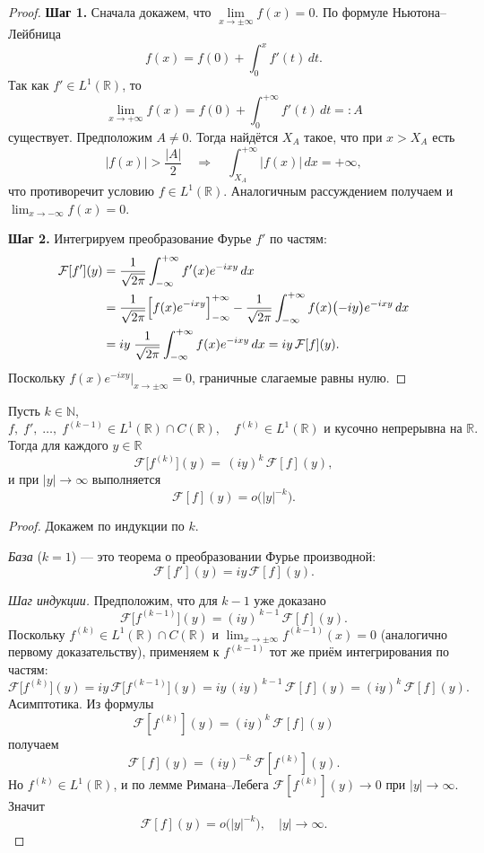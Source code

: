 \begin{proof}
\textbf{Шаг 1.} 
Сначала докажем, что $\lim\limits_{x\to\pm\infty}f(x)=0$. По формуле Ньютона–Лейбница
\[
f(x)=f(0)+\int_{0}^{x}f'(t)\,dt.
\]
Так как $f'\in L^1(\mathbb R)$, то
\[
\lim_{x\to+\infty}f(x)
=f(0)+\int_0^{+\infty}f'(t)\,dt =: A
\]
существует. Предположим $A\neq0$. Тогда найдётся $X_A$ такое, что при $x>X_A$ есть
\[
|f(x)|>\frac{|A|}{2}
\quad\Longrightarrow\quad
\int_{X_A}^{+\infty}|f(x)|\,dx = +\infty,
\]
что противоречит условию $f\in L^1(\mathbb R)$. Аналогичным рассуждением получаем и $\lim_{x\to-\infty}f(x)=0$.

\medskip
\noindent\textbf{Шаг 2.}
Интегрируем преобразование Фурье $f'$ по частям:
\begin{align*}
\mathcal F[f'](y)
&=\frac1{\sqrt{2\pi}}\int_{-\infty}^{+\infty}f'(x)e^{-i x y}\,dx\\
&=\frac1{\sqrt{2\pi}}\Bigl[f(x)e^{-i x y}\Bigr]_{-\infty}^{+\infty}
-\frac1{\sqrt{2\pi}}\int_{-\infty}^{+\infty}f(x)\bigl(-i y\bigr)e^{-i x y}\,dx\\
&= i y\;\frac1{\sqrt{2\pi}}\int_{-\infty}^{+\infty}f(x)e^{-i x y}\,dx
= i y\,\mathcal F[f](y).
\end{align*}
Поскольку $f(x)e^{-i x y}\Big|_{x\to\pm\infty}=0$, граничные слагаемые равны нулю.
\end{proof}
\begin{corollary}
Пусть $k\in\mathbb{N}$, 
\[
f,\;f',\;\dots,\;f^{(k-1)}\in L^1(\mathbb R)\cap C(\mathbb R),
\quad
f^{(k)}\in L^1(\mathbb R)\text{ и кусочно непрерывна на }\mathbb R.
\]
Тогда для каждого $y\in\mathbb R$
\[
\mathcal F\bigl[f^{(k)}\bigr](y)
=\,(i y)^k\,\mathcal F[f](y),
\]
и при $|y|\to\infty$ выполняется
\[
\mathcal F[f](y)=o\bigl(|y|^{-k}\bigr).
\]
\end{corollary}

\begin{proof}
Докажем по индукции по $k$.

\textit{База} ($k=1$) — это теорема о преобразовании Фурье производной:
\[
\mathcal F[f'](y)
=iy\,\mathcal F[f](y).
\]

\textit{Шаг индукции.} Предположим, что для $k-1$ уже доказано
\[
\mathcal F\bigl[f^{(k-1)}\bigr](y)
=(iy)^{\,k-1}\,\mathcal F[f](y).
\]
Поскольку $f^{(k)}\in L^1(\mathbb R)\cap C(\mathbb R)$ и $\lim_{x\to\pm\infty}f^{(k-1)}(x)=0$
(аналогично первому доказательству), применяем к $f^{(k-1)}$ тот же приём интегрирования по частям:
\[
\mathcal F\bigl[f^{(k)}\bigr](y)
=iy\,\mathcal F\bigl[f^{(k-1)}\bigr](y)
=iy\,(iy)^{\,k-1}\,\mathcal F[f](y)
=(iy)^k\,\mathcal F[f](y).
\]
Асимптотика. Из формулы
\[
\mathcal F[f^{(k)}](y)
=(iy)^k\,\mathcal F[f](y)
\]
получаем
\[
\mathcal F[f](y)
=(iy)^{-k}\,\mathcal F[f^{(k)}](y).
\]
Но $f^{(k)}\in L^1(\mathbb R)$, и по лемме Римана–Лебега
$\mathcal F[f^{(k)}](y)\to0$ при $|y|\to\infty$. Значит
\[
\mathcal F[f](y)
=o\bigl(|y|^{-k}\bigr),
\quad |y|\to\infty.
\]
\end{proof}


